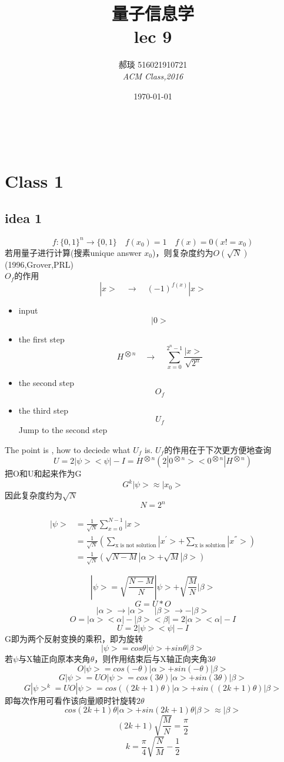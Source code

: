 \documentclass[a4paper, 11pt]{article} %
\title{\textbf{量子信息学}\\ %
lec 9} %
\author{\textsc{郝琰 516021910721} %
\\{\textit{ACM Class,2016}}} %
\date{\today} %
\makeatletter
\renewcommand{\maketitle}{ %

\begin{flushright} %
{\LARGE\@title} %

\vspace{50pt} %

{\large\@author} %
\\\@date %

\vspace{10pt} %
\end{flushright}
}
\makeatother
\begin{document}
\maketitle
\section{Class 1}
\subsection{idea 1}
$$
f: \lbrace0,1\rbrace^n \rightarrow \lbrace 0,1 \rbrace \quad f(x_0) = 1\quad f(x) = 0(x!=x_0)
$$
若用量子进行计算(搜素unique answer $x_0$)，则复杂度约为$O(\sqrt{N})$(1996,Grover,PRL)\\
$O_f$的作用
$$
|x>\quad \rightarrow \quad (-1)^{f(x)}|x>
$$
\begin{itemize}
	\item input 
	$$
	|0>
	$$
	\item the first step
	$$
	H^{\bigotimes n} \quad \rightarrow \quad \sum^{2^n-1}_{x=0} \frac{|x>}{\sqrt{2^n}}
	$$
	\item the second step
	$$
	O_f
	$$
	\item the third step
	$$
	U_f
	$$
	Jump to the second step
\end{itemize}	

The point is , how to deciede what $U_f$ is. $U_f$的作用在于下次更方便地查询
$$
U = 2|\psi><\psi| - I = H^{\bigotimes n}(2|0^{\bigotimes n}><0^{\bigotimes n}|H^{\bigotimes n})
$$
把O和U和起来作为G
$$
G^k|\psi> \approx |x_0>
$$
因此复杂度约为$\sqrt{N}$
$$
N = 2^n
$$

\begin{align*}
|\psi> &=\frac{1}{\sqrt{N}} \sum_{x=0}^{N-1}|x> \\
&= \frac{1}{\sqrt{N}} (\sum_{\mbox{x is not solution}}|x^{'}>+\sum_{\mbox{x is solution}}|x^{''}>)\\
& = \frac{1}{\sqrt{N}}(\sqrt{N-M}|\alpha> + \sqrt{M}|\beta>)
\end{align*}

$$
|\psi> = \sqrt{\frac{N-M}{N}}|\psi> + \sqrt{\frac{M}{N}}|\beta>
$$
$$
G = U*O
$$
$$
|\alpha > \rightarrow |\alpha> \quad |\beta> \rightarrow -|\beta>
$$
$$
O = |\alpha><\alpha| - |\beta><\beta| = 2|\alpha><\alpha| - I
$$
$$
U = 2|\psi><\psi| - I
$$
G即为两个反射变换的乘积，即为旋转
$$
|\psi> = cos\theta|\psi> + sin\theta|\beta>
$$
若$\psi$与X轴正向原本夹角$\theta$，则作用结束后与X轴正向夹角$3\theta$
$$
O|\psi> = cos(-\theta)|\alpha> + sin(-\theta)|\beta>
$$
$$
G|\psi> = UO|\psi> = cos(3\theta)|\alpha> + sin(3\theta)|\beta>
$$
$$
G|\psi>^k = UO|\psi> = cos((2k+1)\theta)|\alpha> + sin((2k+1)\theta)|\beta>
$$
即每次作用可看作该向量顺时针旋转$2\theta$
$$
cos(2k+1)\theta |\alpha> + sin(2k+1)\theta|\beta> \approx |\beta>
$$
$$
(2k+1)\sqrt{\frac{M}{N}} = \frac{\pi}{2}
$$
$$
k = \frac{\pi}{4}\sqrt{\frac{N}{M}} - \frac{1}{2}
$$
\end{document}
